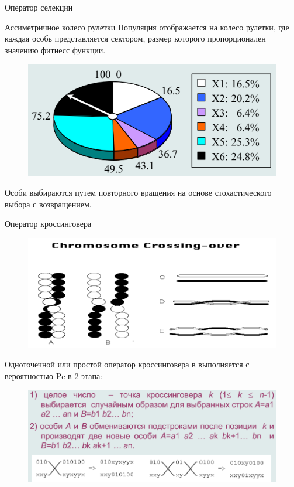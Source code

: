 \documentclass{beamer}
\begin{document}
\begin{frame}{Оператор селекции}
\begin{block}{Ассиметричное колесо рулетки}
Популяция отображается на колесо рулетки, где каждая особь представляется сектором, размер которого пропорционален значению фитнесс функции.
\end{block}
\begin{figure}[h]
\centering
\includegraphics[scale=0.4]{images/lec04-pic07.png}
\end{figure}
Особи выбираются путем повторного вращения на основе стохастического выбора с возвращением.
\end{frame}

\begin{frame}{Оператор кроссинговера}
\begin{figure}[h]
\centering
\includegraphics[scale=0.4]{images/lec04-pic08.png}
\end{figure}
Одноточечной или простой оператор кроссинговера в выполняется с вероятностью Pc в 2 этапа:
\begin{figure}[h]
\centering
\includegraphics[scale=0.4]{images/lec04-pic09.png}
\end{figure}
\end{frame}
\end{document}

